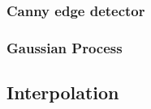 \subsubsection{Canny edge detector}

%
%
\subsubsection{Gaussian Process}\label{subsubsec:gaussianprocess}

\subsection{Interpolation}\label{subsec:interpolation}

